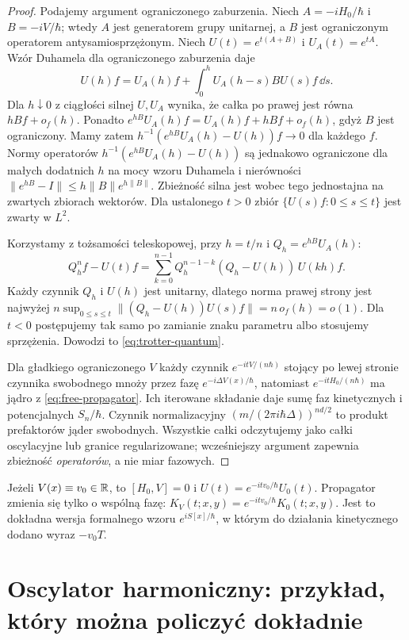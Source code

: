 \begin{proof}
Podajemy argument ograniczonego zaburzenia.
Niech $A=-iH_0/\hbar$ i $B=-iV/\hbar$; wtedy $A$
jest generatorem grupy unitarnej, a $B$ jest
ograniczonym operatorem antysamiosprzężonym.
Niech $U(t)=e^{t(A+B)}$ i $U_A(t)=e^{tA}$.
Wzór Duhamela dla ograniczonego zaburzenia daje
\[
 U(h)f=U_A(h)f+\int_0^h U_A(h-s)BU(s)f\,\dd s.
\]
Dla $h\downarrow0$ z ciągłości silnej $U,U_A$
wynika, że całka po prawej jest równa
$hBf+o_f(h)$. Ponadto
$e^{hB}U_A(h)f=U_A(h)f+hBf+o_f(h)$,
gdyż $B$ jest ograniczony. Mamy zatem
$h^{-1}(e^{hB}U_A(h)-U(h))f\to0$ dla każdego $f$.
Normy operatorów
$h^{-1}(e^{hB}U_A(h)-U(h))$ są jednakowo
ograniczone dla małych dodatnich $h$ na mocy
wzoru Duhamela i nierówności
$\|e^{hB}-I\|\le h\|B\|e^{h\|B\|}$.
Zbieżność silna jest wobec tego jednostajna na
zwartych zbiorach wektorów. Dla ustalonego $t>0$
zbiór $\{U(s)f:0\le s\le t\}$ jest zwarty w $L^2$.

Korzystamy z tożsamości teleskopowej, przy
$h=t/n$ i $Q_h=e^{hB}U_A(h)$:
\[
 Q_h^n f-U(t)f
 =\sum_{k=0}^{n-1} Q_h^{n-1-k}
   (Q_h-U(h))\,U(kh)f.
\]
Każdy czynnik $Q_h$ i $U(h)$ jest unitarny, dlatego
norma prawej strony jest najwyżej
$n\sup_{0\le s\le t}\|(Q_h-U(h))U(s)f\|=n\,o_f(h)=o(1)$.
Dla $t<0$ postępujemy tak samo po zamianie znaku
parametru albo stosujemy sprzężenia. Dowodzi to
\eqref{eq:trotter-quantum}.

Dla gładkiego ograniczonego $V$ każdy czynnik
$e^{-itV/(n\hbar)}$ stojący po lewej stronie czynnika
swobodnego mnoży przez fazę
$e^{-i\Delta V(x)/\hbar}$, natomiast
$e^{-itH_0/(n\hbar)}$ ma jądro z
\eqref{eq:free-propagator}. Ich iterowane składanie daje
sumę faz kinetycznych i potencjalnych
$S_n/\hbar$. Czynnik normalizacyjny
$(m/(2\pi i\hbar\Delta))^{nd/2}$ to produkt
prefaktorów jąder swobodnych. Wszystkie całki
odczytujemy jako całki oscylacyjne lub granice
regularizowane; wcześniejszy argument zapewnia
zbieżność \emph{operatorów}, a nie miar fazowych.
\end{proof}

\begin{przyklad}
Jeżeli $V(x)\equiv v_0\in\mathbb{R}$, to
$[H_0,V]=0$ i $U(t)=e^{-itv_0/\hbar}U_0(t)$.
Propagator zmienia się tylko o wspólną fazę:
$K_V(t;x,y)=e^{-itv_0/\hbar}K_0(t;x,y)$.
Jest to dokładna wersja formalnego wzoru
$e^{iS[x]/\hbar}$, w którym do działania
kinetycznego dodano wyraz $-v_0T$.
\end{przyklad}

\section{Oscylator harmoniczny: przykład, który można policzyć dokładnie}

